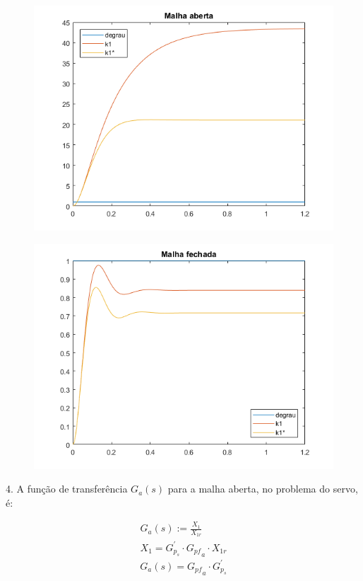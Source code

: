 \documentclass[a4paper,11pt]{article}
\begin{document}
\begin{figure}[H]
\includegraphics{exp01e03f-aberta}
\centering
\end{figure}
\begin{figure}[H]
\includegraphics{exp01e03f-fechada}
\centering
\end{figure}

\pagebreak

4. A função de transferência $G_a\left(s\right)$ para a malha aberta, no
problema do servo, é:

\begin{gather*}
    G_a\left(s\right) := \frac{X_1}{X_{1r}} \\
    X_1 = G^\prime_{p_s} \cdot {G_{pf}}_a \cdot X_{1r}
\end{gather*}
\begin{equation}
    \label{eq:transf-aberta}
    G_a\left(s\right) = {G_{pf}}_a \cdot G^\prime_{p_s}
\end{equation}
\end{document}
